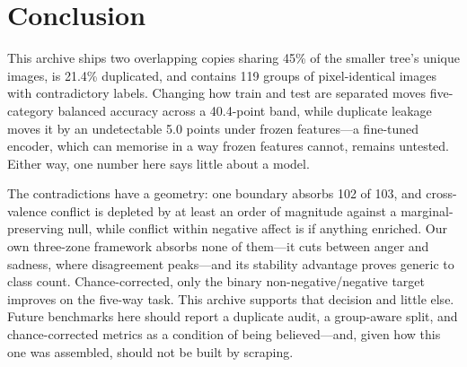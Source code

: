 \documentclass[conference,10pt]{IEEEtran}
\begin{document}
\section{Conclusion}
This archive ships two overlapping copies sharing 45\% of the smaller tree's
unique images, is 21.4\% duplicated, and contains 119 groups of pixel-identical
images with contradictory labels. Changing how train and test are separated
moves five-category balanced accuracy across a 40.4-point band, while duplicate
leakage moves it by an undetectable 5.0 points under frozen features---a
fine-tuned encoder, which can memorise in a way frozen features cannot, remains
untested. Either way, one number here says little about a model.

The contradictions have a geometry: one boundary absorbs 102 of 103, and
cross-valence conflict is depleted by at least an order of magnitude against a
marginal-preserving null, while conflict within negative affect is if anything
enriched. Our own three-zone
framework absorbs none of them---it cuts between anger and sadness, where
disagreement peaks---and its stability advantage proves generic to class count.
Chance-corrected, only the binary non-negative/negative target improves on the
five-way task. This archive supports that decision and little else. Future
benchmarks here should report a duplicate audit, a group-aware split, and
chance-corrected metrics as a condition of being believed---and, given how this
one was assembled, should not be built by scraping.




\end{document}

